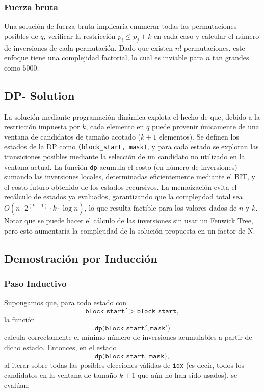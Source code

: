 ﻿\documentclass{article}
\theoremstyle{plain}
\theoremstyle{definition}
\begin{document}
\subsubsection{Fuerza bruta}
Una solución de fuerza bruta implicaría enumerar todas las permutaciones posibles de $q$, verificar la restricción $p_i \le p_j + k$ en cada caso y calcular el número de inversiones de cada permutación. Dado que existen $n!$ permutaciones, este enfoque tiene una complejidad factorial, lo cual es inviable para $n$ tan grandes como $5000$. 

\subsection{DP- Solution}
La solución mediante programación dinámica explota el hecho de que, debido a la restricción impuesta por $k$, cada elemento en $q$ puede provenir únicamente de una ventana de candidatos de tamaño acotado ($k+1$ elementos). Se definen los estados de la DP como \texttt{(block\_start, mask)}, y para cada estado se exploran las transiciones posibles mediante la selección de un candidato no utilizado en la ventana actual. La función \texttt{dp} acumula el costo (en número de inversiones) sumando las inversiones locales, determinadas eficientemente mediante el BIT, y el costo futuro obtenido de los estados recursivos. La memoización evita el recálculo de estados ya evaluados, garantizando que la complejidad total sea $O(n \cdot 2^{(k+1)} \cdot k \cdot \log n)$, lo que resulta factible para los valores dados de $n$ y $k$. Notar que se puede hacer el cálculo de las inversiones sin usar un Fenwick Tree, pero esto aumentaría la complejidad de la solución propuesta en un factor de N.


\subsection{Demostración por Inducción}

\subsubsection{Paso Inductivo}

Supongamos que, para todo estado con 
\[
\texttt{block\_start}' > \texttt{block\_start},
\]
la función 
\[
\texttt{dp(block\_start}', \texttt{mask}')
\]
calcula correctamente el mínimo número de inversiones acumulables a partir de dicho estado. Entonces, en el estado 
\[
\texttt{dp(block\_start, mask)},
\]
al iterar sobre todas las posibles elecciones válidas de \texttt{idx} (es decir, todos los candidatos en la ventana de tamaño $k+1$ que aún no han sido usados), se evalúan:
\end{document}
